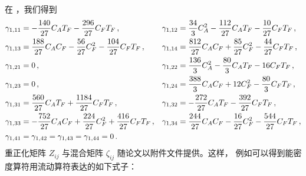 在 \nnlo，我们得到
\begin{equation}
\begin{aligned}
		\gamma_{1, 1 1} &= - \frac{140}{27} C_A T_F -
                \frac{296}{27} C_F T_F\,,  & \gamma_{1, 1 2}
                &=  \frac{34}{3} C_A^2 - \frac{112}{27} C_A
                T_F - \frac{10}{27} C_F  T_F\,, \\
		\gamma_{1, 1 3} &=  \frac{188}{27} C_A C_F -
                \frac{56}{27} C_F^2 - \frac{104}{27} C_F T_F\,, &
                \gamma_{1, 1 4} &=  \frac{812}{27} C_A C_F +
                \frac{85}{27} C_F^2 - \frac{44}{27} C_F T_F\,, \\
		\gamma_{1, 2 1} &= 0\,, & \gamma_{1, 2 2} &=
                \frac{136}{3} C_A^2 - \frac{80}{3} C_A  T_F - 16 C_F
                T_F \,, \\
		\gamma_{1, 2 3} &= 0\,, & \gamma_{1, 2 4} &=
                \frac{388}{3} C_A  C_F + 12 C_F^2 - \frac{80}{3} C_F
                T_F\,, \\
		\gamma_{1, 3 1} &= \frac{560}{27} C_A  T_F +
                \frac{1184}{27} C_F   T_F\,, & \gamma_{1, 3 2} &=
                - \frac{272}{27} C_A  T_F - \frac{392}{27} C_F
                T_F\,, \\
		\gamma_{1, 3 3} &= - \frac{752}{27} C_A  C_F +
                \frac{224}{27} C_F^2 + \frac{416}{27} C_F   T_F\,, &
                \gamma_{1, 3 4} &= \frac{244}{27} C_A C_F -
                \frac{16}{27} C_F^2 - \frac{544}{27} C_F   T_F\,, \\
		\gamma_{1, 4 1} &= \gamma_{1, 4 2} = \gamma_{1, 4 3} =
                \gamma_{1, 4 4} = 0\,.
    \label{eq:}
\end{aligned}
\end{equation}
重正化矩阵 $Z_{ij}$ 与混合矩阵 $\zeta_{ij}$ 随论文以附件文件提供。这样，
例如可以得到能密度算符用流动算符表达的如下式子：
